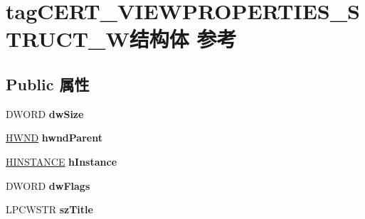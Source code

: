 \hypertarget{structtag_c_e_r_t___v_i_e_w_p_r_o_p_e_r_t_i_e_s___s_t_r_u_c_t___w}{}\section{tag\+C\+E\+R\+T\+\_\+\+V\+I\+E\+W\+P\+R\+O\+P\+E\+R\+T\+I\+E\+S\+\_\+\+S\+T\+R\+U\+C\+T\+\_\+\+W结构体 参考}
\label{structtag_c_e_r_t___v_i_e_w_p_r_o_p_e_r_t_i_e_s___s_t_r_u_c_t___w}
\subsection*{Public 属性}
\begin{DoxyCompactItemize}
\item 
\mbox{\label{structtag_c_e_r_t___v_i_e_w_p_r_o_p_e_r_t_i_e_s___s_t_r_u_c_t___w_a4f1deec8bc094b473946898f736b804a}} 
D\+W\+O\+RD {\bfseries dw\+Size}
\item 
\mbox{\label{structtag_c_e_r_t___v_i_e_w_p_r_o_p_e_r_t_i_e_s___s_t_r_u_c_t___w_aee2d4dfbd09907fed70c1ea4c7e2f891}} 
\hyperlink{interfacevoid}{H\+W\+ND} {\bfseries hwnd\+Parent}
\item 
\mbox{\label{structtag_c_e_r_t___v_i_e_w_p_r_o_p_e_r_t_i_e_s___s_t_r_u_c_t___w_ae93aecaa29606582df555773878add88}} 
\hyperlink{interfacevoid}{H\+I\+N\+S\+T\+A\+N\+CE} {\bfseries h\+Instance}
\item 
\mbox{\label{structtag_c_e_r_t___v_i_e_w_p_r_o_p_e_r_t_i_e_s___s_t_r_u_c_t___w_a32efdfa3ced526bf104e3c6bc8602592}} 
D\+W\+O\+RD {\bfseries dw\+Flags}
\item 
\mbox{\label{structtag_c_e_r_t___v_i_e_w_p_r_o_p_e_r_t_i_e_s___s_t_r_u_c_t___w_a9bbb34150dad0f471c45e5d0da5cde15}} 
L\+P\+C\+W\+S\+TR {\bfseries sz\+Title}
\item 
\mbox{\label{structtag_c_e_r_t___v_i_e_w_p_r_o_p_e_r_t_i_e_s___s_t_r_u_c_t___w_a56365df7c29dac3a001e9183d589ffc7}} 

\end{DoxyCompactItemize}
